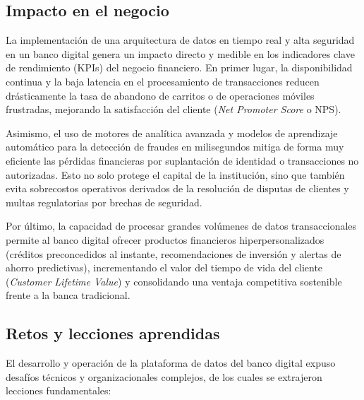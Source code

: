\documentclass[12pt,a4paper]{article}
\begin{document}
\subsection{Impacto en el negocio}
La implementación de una arquitectura de datos en tiempo real y alta seguridad en un banco digital genera un impacto directo y medible en los indicadores clave de rendimiento (KPIs) del negocio financiero. En primer lugar, la disponibilidad continua y la baja latencia en el procesamiento de transacciones reducen drásticamente la tasa de abandono de carritos o de operaciones móviles frustradas, mejorando la satisfacción del cliente (\textit{Net Promoter Score} o NPS).

Asimismo, el uso de motores de analítica avanzada y modelos de aprendizaje automático para la detección de fraudes en milisegundos mitiga de forma muy eficiente las pérdidas financieras por suplantación de identidad o transacciones no autorizadas. Esto no solo protege el capital de la institución, sino que también evita sobrecostos operativos derivados de la resolución de disputas de clientes y multas regulatorias por brechas de seguridad. 

Por último, la capacidad de procesar grandes volúmenes de datos transaccionales permite al banco digital ofrecer productos financieros hiperpersonalizados (créditos preconcedidos al instante, recomendaciones de inversión y alertas de ahorro predictivas), incrementando el valor del tiempo de vida del cliente (\textit{Customer Lifetime Value}) y consolidando una ventaja competitiva sostenible frente a la banca tradicional.

\subsection{Retos y lecciones aprendidas}
El desarrollo y operación de la plataforma de datos del banco digital expuso desafíos técnicos y organizacionales complejos, de los cuales se extrajeron lecciones fundamentales:
\end{document}
